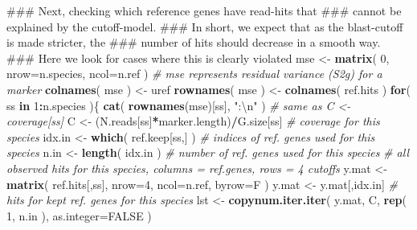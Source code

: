 \documentclass[]{article}
\newenvironment{Shaded}{\begin{snugshade}}{\end{snugshade}}
\newcommand{\KeywordTok}[1]{\textcolor[rgb]{0.13,0.29,0.53}{\textbf{#1}}}
\newcommand{\DataTypeTok}[1]{\textcolor[rgb]{0.13,0.29,0.53}{#1}}
\newcommand{\DecValTok}[1]{\textcolor[rgb]{0.00,0.00,0.81}{#1}}
\newcommand{\CharTok}[1]{\textcolor[rgb]{0.31,0.60,0.02}{#1}}
\newcommand{\StringTok}[1]{\textcolor[rgb]{0.31,0.60,0.02}{#1}}
\newcommand{\CommentTok}[1]{\textcolor[rgb]{0.56,0.35,0.01}{\textit{#1}}}
\newcommand{\OtherTok}[1]{\textcolor[rgb]{0.56,0.35,0.01}{#1}}
\newcommand{\ControlFlowTok}[1]{\textcolor[rgb]{0.13,0.29,0.53}{\textbf{#1}}}
\newcommand{\OperatorTok}[1]{\textcolor[rgb]{0.81,0.36,0.00}{\textbf{#1}}}
\newcommand{\NormalTok}[1]{#1}
\begin{document}
\begin{Shaded}
\begin{Highlighting}[]
\NormalTok{### Next, checking which reference genes have read-hits that}
\NormalTok{### cannot be explained by the cutoff-model.}
\NormalTok{### In short, we expect that as the blast-cutoff is made stricter, the}
\NormalTok{### number of hits should decrease in a smooth way.}
\NormalTok{### Here we look for cases where this is clearly violated}
\NormalTok{mse <-}\StringTok{ }\KeywordTok{matrix}\NormalTok{( }\DecValTok{0}\NormalTok{, }\DataTypeTok{nrow=}\NormalTok{n.species, }\DataTypeTok{ncol=}\NormalTok{n.ref )       }\CommentTok{# mse represents residual variance (S2g) for a marker }
\KeywordTok{colnames}\NormalTok{( mse ) <-}\StringTok{ }\NormalTok{uref}
\KeywordTok{rownames}\NormalTok{( mse ) <-}\StringTok{ }\KeywordTok{colnames}\NormalTok{( ref.hits )}
\ControlFlowTok{for}\NormalTok{( ss }\ControlFlowTok{in} \DecValTok{1}\OperatorTok{:}\NormalTok{n.species )\{}
  \KeywordTok{cat}\NormalTok{( }\KeywordTok{rownames}\NormalTok{(mse)[ss], }\StringTok{":}\CharTok{\textbackslash{}n}\StringTok{"}\NormalTok{ )}
  \CommentTok{# same as C <- coverage[ss] }
\NormalTok{  C <-}\StringTok{ }\NormalTok{(N.reads[ss]}\OperatorTok{*}\NormalTok{marker.length)}\OperatorTok{/}\NormalTok{G.size[ss]     }\CommentTok{# coverage for this species}
\NormalTok{  idx.in <-}\StringTok{ }\KeywordTok{which}\NormalTok{( ref.keep[ss,] )                }\CommentTok{# indices of ref. genes used for this species}
\NormalTok{  n.in <-}\StringTok{ }\KeywordTok{length}\NormalTok{( idx.in )                        }\CommentTok{# number of ref. genes used for this species}
  \CommentTok{# all observed hits for this species, columns = ref.genes, rows = 4 cutoffs}
\NormalTok{  y.mat <-}\StringTok{ }\KeywordTok{matrix}\NormalTok{( ref.hits[,ss], }\DataTypeTok{nrow=}\DecValTok{4}\NormalTok{, }\DataTypeTok{ncol=}\NormalTok{n.ref, }\DataTypeTok{byrow=}\NormalTok{F ) }
\NormalTok{  y.mat <-}\StringTok{ }\NormalTok{y.mat[,idx.in]                         }\CommentTok{# hits for kept ref. genes for this species}
\NormalTok{  lst <-}\StringTok{ }\KeywordTok{copynum.iter.iter}\NormalTok{( y.mat, C, }\KeywordTok{rep}\NormalTok{( }\DecValTok{1}\NormalTok{, n.in ), }\DataTypeTok{as.integer=}\OtherTok{FALSE}\NormalTok{ )}
  

\end{Highlighting}
\end{Shaded}
\end{document}
